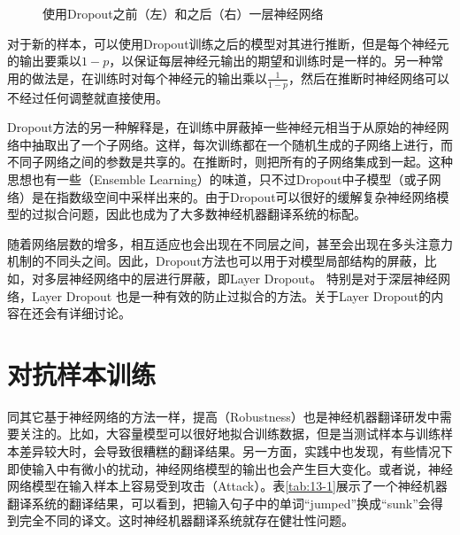 \begin{figure}[htp]
\centering

\caption{使用Dropout之前（左）和之后（右）一层神经网络}
\label{fig:13-7}
\end{figure}

\parinterval 对于新的样本，可以使用Dropout训练之后的模型对其进行推断，但是每个神经元的输出要乘以$1-p$，以保证每层神经元输出的期望和训练时是一样的。另一种常用的做法是，在训练时对每个神经元的输出乘以$\frac{1}{1-p}$，然后在推断时神经网络可以不经过任何调整就直接使用。

\parinterval Dropout方法的另一种解释是，在训练中屏蔽掉一些神经元相当于从原始的神经网络中抽取出了一个子网络。这样，每次训练都在一个随机生成的子网络上进行，而不同子网络之间的参数是共享的。在推断时，则把所有的子网络集成到一起。这种思想也有一些{\small{}}（Ensemble Learning）的味道，只不过Dropout中子模型（或子网络）是在指数级空间中采样出来的。由于Dropout可以很好的缓解复杂神经网络模型的过拟合问题，因此也成为了大多数神经机器翻译系统的标配。

\parinterval 随着网络层数的增多，相互适应也会出现在不同层之间，甚至会出现在多头注意力机制的不同头之间。因此，Dropout方法也可以用于对模型局部结构的屏蔽，比如，对多层神经网络中的层进行屏蔽，即Layer Dropout。 特别是对于深层神经网络，Layer Dropout 也是一种有效的防止过拟合的方法。关于Layer Dropout的内容在{\chapterfifteen}还会有详细讨论。


\sectionnewpage
\section{对抗样本训练}
\label{sec:adversarial-examples}

\parinterval 同其它基于神经网络的方法一样，提高{\small{}}（Robustness）也是神经机器翻译研发中需要关注的。比如，大容量模型可以很好地拟合训练数据，但是当测试样本与训练样本差异较大时，会导致很糟糕的翻译结果。另一方面，实践中也发现，有些情况下即使输入中有微小的扰动，神经网络模型的输出也会产生巨大变化。或者说，神经网络模型在输入样本上容易受到攻击（Attack）。表\ref{tab:13-1}展示了一个神经机器翻译系统的翻译结果，可以看到，把输入句子中的单词“jumped”换成“sunk”会得到完全不同的译文。这时神经机器翻译系统就存在健壮性问题。

